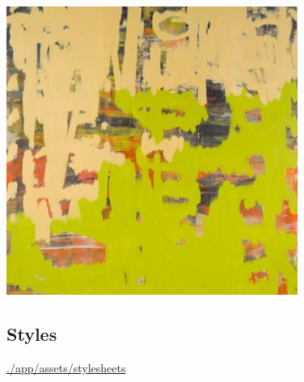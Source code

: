 \documentclass[11pt]{article}
\begin{document}
\includegraphics[width=.9\linewidth]{./app/assets/images/rudasill_2.jpeg}


\subsection*{Styles}
\label{sec-1-4}

\url{./app/assets/stylesheets}
\end{document}

